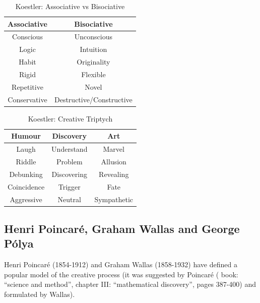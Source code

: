 \begin{table}[p]
  \centering
  \begin{tabu}{cc}
  \toprule
  \textbf{Associative} & \textbf{Bisociative}     \\
  \midrule
  Conscious            & Unconscious              \\
  Logic                & Intuition                \\
  Habit                & Originality              \\
  Rigid                & Flexible                 \\
  Repetitive           & Novel                    \\
  Conservative         & Destructive/Constructive \\
  \bottomrule
  \end{tabu}
\caption[Associative vs Bisociative]{Koestler: Associative vs Bisociative}
\label{KAB}
\end{table}

\begin{table}[p]
  \centering
  \begin{tabu}{ccc}
  \toprule
  \textbf{Humour} & \textbf{Discovery} & \textbf{Art} \\
  \midrule
  Laugh           & Understand         & Marvel       \\
  Riddle          & Problem            & Allusion     \\
  Debunking       & Discovering        & Revealing    \\
  Coincidence     & Trigger            & Fate         \\
  Aggressive      & Neutral            & Sympathetic  \\
  \bottomrule
  \end{tabu}
\caption[Creative Triptych]{Koestler: Creative Triptych}
\label{KHDA}
\end{table}

\subsection{Henri Poincaré, Graham Wallas and George Pólya}

Henri Poincaré (1854-1912) \citep{Poincare2001} and Graham Wallas (1858-1932) \citep{Wallas1926} have defined a popular model \citep{Boden2003, Koestler1964, Partridge1994} of the creative process (it was suggested by Poincaré  (\citep{Poincare2001} book: ``science and method'', chapter III: ``mathematical discovery'', pages 387-400) and formulated by Wallas).

